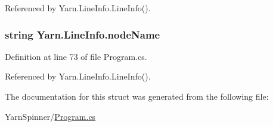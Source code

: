 Referenced by Yarn.\-Line\-Info.\-Line\-Info().

\hypertarget{a00121_a5a91331fb123e29d71d69e096f943c2f}{
\subsubsection[{node\-Name}]{\setlength{\rightskip}{0pt plus 5cm}string Yarn.\-Line\-Info.\-node\-Name}}\label{a00121_a5a91331fb123e29d71d69e096f943c2f}


Definition at line 73 of file Program.\-cs.



Referenced by Yarn.\-Line\-Info.\-Line\-Info().



The documentation for this struct was generated from the following file\-:\begin{DoxyCompactItemize}
\item 
Yarn\-Spinner/\hyperlink{a00296}{Program.\-cs}\end{DoxyCompactItemize}
